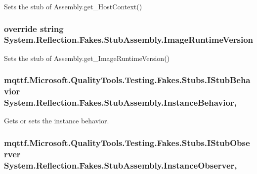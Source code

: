 Sets the stub of Assembly.\-get\-\_\-\-Host\-Context()

\hypertarget{class_system_1_1_reflection_1_1_fakes_1_1_stub_assembly_aea494a368a93b8df1ec7b812537df542}{
\subsubsection[{Image\-Runtime\-Version}]{\setlength{\rightskip}{0pt plus 5cm}override string System.\-Reflection.\-Fakes.\-Stub\-Assembly.\-Image\-Runtime\-Version\hspace{0.3cm}{\ttfamily [get]}}}\label{class_system_1_1_reflection_1_1_fakes_1_1_stub_assembly_aea494a368a93b8df1ec7b812537df542}


Sets the stub of Assembly.\-get\-\_\-\-Image\-Runtime\-Version()

\hypertarget{class_system_1_1_reflection_1_1_fakes_1_1_stub_assembly_aad675ab9c602f0e72f015ef3d44d07fc}{
\subsubsection[{Instance\-Behavior}]{\setlength{\rightskip}{0pt plus 5cm}mqttf.\-Microsoft.\-Quality\-Tools.\-Testing.\-Fakes.\-Stubs.\-I\-Stub\-Behavior System.\-Reflection.\-Fakes.\-Stub\-Assembly.\-Instance\-Behavior\hspace{0.3cm}{\ttfamily [get]}, {\ttfamily [set]}}}\label{class_system_1_1_reflection_1_1_fakes_1_1_stub_assembly_aad675ab9c602f0e72f015ef3d44d07fc}


Gets or sets the instance behavior.

\hypertarget{class_system_1_1_reflection_1_1_fakes_1_1_stub_assembly_a9c2e6c1d422376c4cd941022ce312b6c}{
\subsubsection[{Instance\-Observer}]{\setlength{\rightskip}{0pt plus 5cm}mqttf.\-Microsoft.\-Quality\-Tools.\-Testing.\-Fakes.\-Stubs.\-I\-Stub\-Observer System.\-Reflection.\-Fakes.\-Stub\-Assembly.\-Instance\-Observer\hspace{0.3cm}{\ttfamily [get]}, {\ttfamily [set]}}}\label{class_system_1_1_reflection_1_1_fakes_1_1_stub_assembly_a9c2e6c1d422376c4cd941022ce312b6c}


